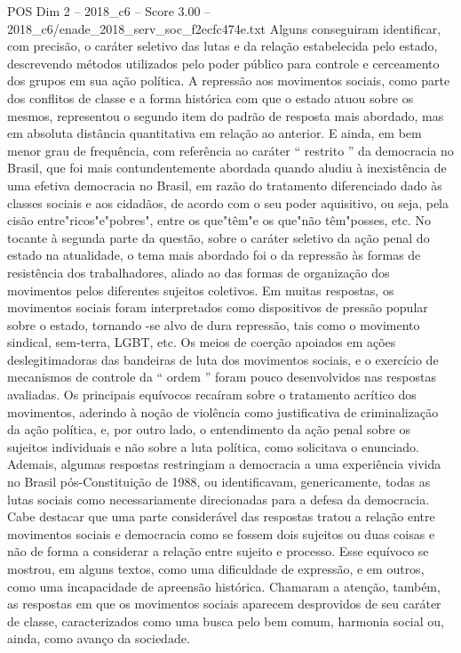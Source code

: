 \begin{textsample}{POS Dim 2 – 2018\_c6 – Score 3.00 – 2018\_c6/enade\_2018\_serv\_soc\_f2ecfc474e.txt}
Alguns conseguiram identificar, com precisão, o caráter seletivo das lutas e da relação estabelecida pelo estado, descrevendo métodos utilizados pelo poder público para controle e cerceamento dos grupos em sua ação política.
A repressão aos movimentos sociais, como parte dos conflitos de classe e a forma histórica com que o estado atuou sobre os mesmos, representou o segundo item do padrão de resposta mais abordado, mas em absoluta distância quantitativa em relação ao anterior.
E ainda, em bem menor grau de frequência, com referência ao caráter “ restrito ” da democracia no Brasil, que foi mais contundentemente abordada quando aludiu à inexistência de uma efetiva democracia no Brasil, em razão do tratamento diferenciado dado às classes sociais e aos cidadãos, de acordo com o seu poder aquisitivo, ou seja, pela cisão entre"ricos"e"pobres", entre os que"têm"e os que"não têm"posses, etc.
No tocante à segunda parte da questão, sobre o caráter seletivo da ação penal do estado na atualidade, o tema mais abordado foi o da repressão às formas de resistência dos trabalhadores, aliado ao das formas de organização dos movimentos pelos diferentes sujeitos coletivos.
Em muitas respostas, os movimentos sociais foram interpretados como dispositivos de pressão popular sobre o estado, tornando -se alvo de dura repressão, tais como o movimento sindical, sem-terra, LGBT, etc.
Os meios de coerção apoiados em ações deslegitimadoras das bandeiras de luta dos movimentos sociais, e o exercício de mecanismos de controle da “ ordem ” foram pouco desenvolvidos nas respostas avaliadas.
Os principais equívocos recaíram sobre o tratamento acrítico dos movimentos, aderindo à noção de violência como justificativa de criminalização da ação política, e, por outro lado, o entendimento da ação penal sobre os sujeitos individuais e não sobre a luta política, como solicitava o enunciado.
Ademais, algumas respostas restringiam a democracia a uma experiência vivida no Brasil pós-Constituição de 1988, ou identificavam, genericamente, todas as lutas sociais como necessariamente direcionadas para a defesa da democracia.
Cabe destacar que uma parte considerável das respostas tratou a relação entre movimentos sociais e democracia como se fossem dois sujeitos ou duas coisas e não de forma a considerar a relação entre sujeito e processo.
Esse equívoco se mostrou, em alguns textos, como uma dificuldade de expressão, e em outros, como uma incapacidade de apreensão histórica.
Chamaram a atenção, também, as respostas em que os movimentos sociais aparecem desprovidos de seu caráter de classe, caracterizados como uma busca pelo bem comum, harmonia social ou, ainda, como avanço da sociedade.

\end{textsample}
